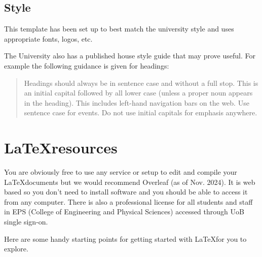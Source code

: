 \subsection{Style}
This template has been set up to best match the university style and uses appropriate fonts, logos, etc.

The University also has a published house style guide \parencite{uniofbirmingham2024housestyleguide} that may prove useful. For example the following guidance is given for headings:

\begin{quote}
    Headings should always be in sentence case and without a full stop. This is an initial capital followed by all lower case (unless a proper noun appears in the heading). This includes left-hand navigation bars on the web. Use sentence case for events. Do not use initial capitals for emphasis anywhere.
\end{quote}

\section{\LaTeX resources} \label{sec:latex_resources}
You are obviously free to use any service or setup to edit and compile your \LaTeX documents but we would recommend Overleaf (as of Nov. 2024). It is web based so you don't need to install software and you should be able to access it from any computer. There is also a professional license for all students and staff in EPS (College of Engineering and Physical Sciences) accessed through UoB single sign-on.

Here are some handy starting points for getting started with \LaTeX for you to explore.

